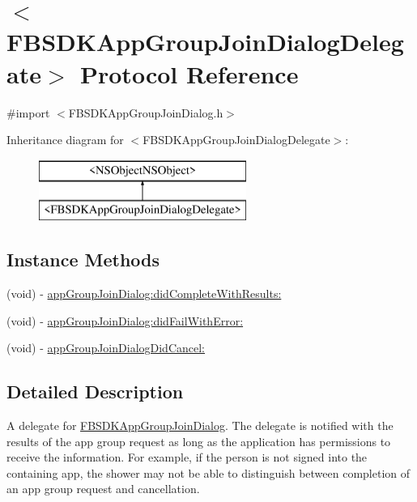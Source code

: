 \hypertarget{protocol_f_b_s_d_k_app_group_join_dialog_delegate-p}{}\section{$<$F\+B\+S\+D\+K\+App\+Group\+Join\+Dialog\+Delegate$>$ Protocol Reference}
\label{protocol_f_b_s_d_k_app_group_join_dialog_delegate-p}


{\ttfamily \#import $<$F\+B\+S\+D\+K\+App\+Group\+Join\+Dialog.\+h$>$}

Inheritance diagram for $<$F\+B\+S\+D\+K\+App\+Group\+Join\+Dialog\+Delegate$>$\+:\begin{figure}[H]
\begin{center}
\leavevmode
\includegraphics[height=2.000000cm]{protocol_f_b_s_d_k_app_group_join_dialog_delegate-p}
\end{center}
\end{figure}
\subsection*{Instance Methods}
\begin{DoxyCompactItemize}
\item 
(void) -\/ \hyperlink{protocol_f_b_s_d_k_app_group_join_dialog_delegate-p_a809da42b13fb800917b7b96b30ac4341}{app\+Group\+Join\+Dialog\+:did\+Complete\+With\+Results\+:}
\item 
(void) -\/ \hyperlink{protocol_f_b_s_d_k_app_group_join_dialog_delegate-p_a317e412e820965fdb565aac33f485172}{app\+Group\+Join\+Dialog\+:did\+Fail\+With\+Error\+:}
\item 
(void) -\/ \hyperlink{protocol_f_b_s_d_k_app_group_join_dialog_delegate-p_af7e3430110b339e8115f3b79f766cfb3}{app\+Group\+Join\+Dialog\+Did\+Cancel\+:}
\end{DoxyCompactItemize}


\subsection{Detailed Description}
A delegate for \hyperlink{interface_f_b_s_d_k_app_group_join_dialog}{F\+B\+S\+D\+K\+App\+Group\+Join\+Dialog}.  The delegate is notified with the results of the app group request as long as the application has permissions to receive the information. For example, if the person is not signed into the containing app, the shower may not be able to distinguish between completion of an app group request and cancellation. 

